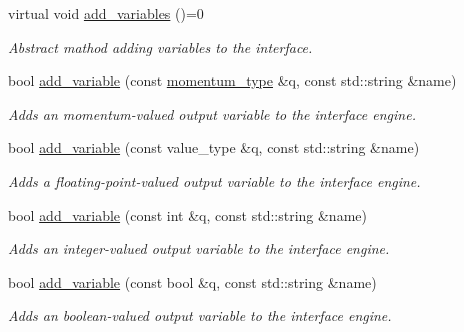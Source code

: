 \begin{DoxyCompactItemize}
\item 
virtual void \hyperlink{a00318_a9a6ee7dc4e89ecec32603e51da802cc4}{add\+\_\+variables} ()=0
\begin{DoxyCompactList}\small\item\em Abstract mathod adding variables to the interface. \end{DoxyCompactList}\item 
\hypertarget{a00318_a7500d971ef67d2045a64fdb9429a810c}{}bool \hyperlink{a00318_a7500d971ef67d2045a64fdb9429a810c}{add\+\_\+variable} (const \hyperlink{a00579}{momentum\+\_\+type} \&q, const std\+::string \&name)\label{a00318_a7500d971ef67d2045a64fdb9429a810c}

\begin{DoxyCompactList}\small\item\em Adds an momentum-\/valued output variable to the interface engine. \end{DoxyCompactList}\item 
\hypertarget{a00318_aca7d353daee5721c27a6e33571366a34}{}bool \hyperlink{a00318_aca7d353daee5721c27a6e33571366a34}{add\+\_\+variable} (const value\+\_\+type \&q, const std\+::string \&name)\label{a00318_aca7d353daee5721c27a6e33571366a34}

\begin{DoxyCompactList}\small\item\em Adds a floating-\/point-\/valued output variable to the interface engine. \end{DoxyCompactList}\item 
\hypertarget{a00318_a47a525730c8a76d72d4612ac9390a360}{}bool \hyperlink{a00318_a47a525730c8a76d72d4612ac9390a360}{add\+\_\+variable} (const int \&q, const std\+::string \&name)\label{a00318_a47a525730c8a76d72d4612ac9390a360}

\begin{DoxyCompactList}\small\item\em Adds an integer-\/valued output variable to the interface engine. \end{DoxyCompactList}\item 
\hypertarget{a00318_a83adfb42e106a738461bceb4df4d1881}{}bool \hyperlink{a00318_a83adfb42e106a738461bceb4df4d1881}{add\+\_\+variable} (const bool \&q, const std\+::string \&name)\label{a00318_a83adfb42e106a738461bceb4df4d1881}

\begin{DoxyCompactList}\small\item\em Adds an boolean-\/valued output variable to the interface engine. \end{DoxyCompactList}\end{DoxyCompactItemize}
